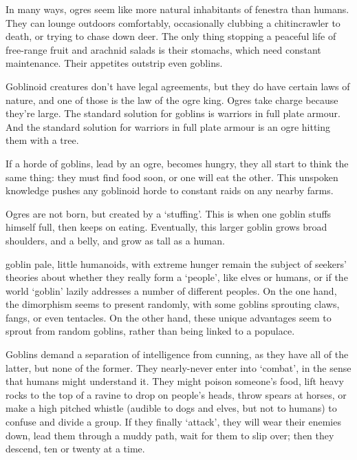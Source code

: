\begin{multicols}{2}

\noindent
In many ways, ogres seem like more natural inhabitants of \gls{fenestra} than humans.
They can lounge outdoors comfortably, occasionally clubbing a chitincrawler to death, or trying to chase down deer.
The only thing stopping a peaceful life of free-range fruit and arachnid salads is their stomachs, which need constant maintenance.
Their appetites outstrip even goblins.

Goblinoid creatures don't have legal agreements, but they do have certain laws of nature, and one of those is the law of the ogre king.
Ogres take charge because they're large.
The standard solution for goblins is warriors in full plate armour.
And the standard solution for warriors in full plate armour is an ogre hitting them with a tree.

If a horde of goblins, lead by an ogre, becomes hungry, they all start to think the same thing: they must find food soon, or one will eat the other.
This unspoken knowledge pushes any goblinoid horde to constant raids on any nearby farms.

Ogres are not born, but created by a `stuffing'.
This is when one goblin stuffs himself full, then keeps on eating.
Eventually, this larger goblin grows broad shoulders, and a belly, and grow as tall as a human.

  {goblin}%
  {pale, little humanoids, with extreme hunger}%
remain the subject of \glspl{seeker}' theories about whether they really form a `people', like elves or humans, or if the world `goblin' lazily addresses a number of different peoples.
On the one hand, the dimorphism seems to present randomly, with some goblins sprouting claws, fangs, or even tentacles.
On the other hand, these unique advantages seem to sprout from random goblins, rather than being linked to a populace.

Goblins demand a separation of intelligence from cunning, as they have all of the latter, but none of the former.
They nearly-never enter into `combat', in the sense that humans might understand it.
They might poison someone's food, lift heavy rocks to the top of a ravine to drop on people's heads, throw spears at horses, or make a high pitched whistle (audible to dogs and elves, but not to humans) to confuse and divide a group.
If they finally `attack', they will wear their enemies down, lead them through a muddy path, wait for them to slip over; then they descend, ten or twenty at a time.


\end{multicols}
